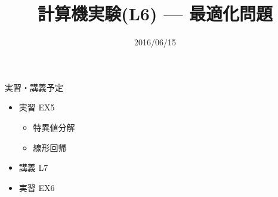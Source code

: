 \documentclass[dvipdfmx]{beamer}
\title{計算機実験(L6) --- 最適化問題}
\date{2016/06/15}
\begin{document}
\begin{frame}
  \titlepage
  \tableofcontents
\end{frame}








\section{}

\begin{frame}[t,fragile]{実習・講義予定}
  \begin{itemize}
    \setlength{\itemsep}{1em}
  \item 実習 EX5
    \begin{itemize}
    \item 特異値分解
    \item 線形回帰
    \end{itemize}
  \item 講義 L7
  \item 実習 EX6
  \end{itemize}
\end{frame}
\end{document}
